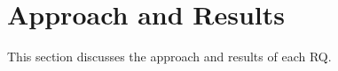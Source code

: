 \section{Approach and Results}\label{sec:approach_results}
This section discusses the approach and results of each RQ.





